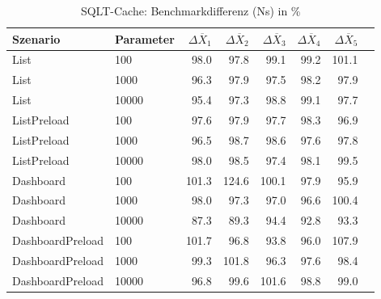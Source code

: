 
\begin{table}[ht]
\setlength{\extrarowheight}{-1pt}
\centering
\caption{SQLT-Cache: Benchmarkdifferenz (Ns) in \%}
\begin{tabular}{llrrrrrr}
\toprule
Szenario & Parameter & ${\Delta \overline{X}_1}$ & ${\Delta \overline{X}_2}$ & ${\Delta \overline{X}_3}$ & ${\Delta \overline{X}_4}$ & ${\Delta \overline{X}_5}$ \\
\midrule
	List & 100 &  98.0 & \cellcolor{green!11}  97.8 &  99.1 &  99.2 &  101.1 \\
	List & 1000 & \cellcolor{green!11}  96.3 & \cellcolor{green!11}  97.9 & \cellcolor{green!11}  97.5 &  98.2 & \cellcolor{green!11}  97.9 \\
	List & 10000 & \cellcolor{green!12}  95.4 & \cellcolor{green!11}  97.3 &  98.8 &  99.1 & \cellcolor{green!11}  97.7 \\
	ListPreload & 100 & \cellcolor{green!11}  97.6 & \cellcolor{green!11}  97.9 & \cellcolor{green!11}  97.7 &  98.3 & \cellcolor{green!11}  96.9 \\
	ListPreload & 1000 & \cellcolor{green!11}  96.5 &  98.7 &  98.6 & \cellcolor{green!11}  97.6 & \cellcolor{green!11}  97.8 \\
	ListPreload & 10000 & \cellcolor{green!11}  98.0 &  98.5 & \cellcolor{green!11}  97.4 &  98.1 &  99.5 \\
	Dashboard & 100 &  101.3 & \cellcolor{red!20}  124.6 &  100.1 & \cellcolor{green!11}  97.9 & \cellcolor{green!12}  95.9 \\
	Dashboard & 1000 &  98.0 & \cellcolor{green!11}  97.3 & \cellcolor{green!11}  97.0 & \cellcolor{green!11}  96.6 &  100.4 \\
	Dashboard & 10000 & \cellcolor{green!15}  87.3 & \cellcolor{green!14}  89.3 & \cellcolor{green!12}  94.4 & \cellcolor{green!13}  92.8 & \cellcolor{green!13}  93.3 \\
	DashboardPreload & 100 &  101.7 & \cellcolor{green!11}  96.8 & \cellcolor{green!12}  93.8 & \cellcolor{green!12}  96.0 & \cellcolor{red!13}  107.9 \\
	DashboardPreload & 1000 &  99.3 &  101.8 & \cellcolor{green!11}  96.3 & \cellcolor{green!11}  97.6 &  98.4 \\
	DashboardPreload & 10000 & \cellcolor{green!11}  96.8 &  99.6 &  101.6 &  98.8 &  99.0 \\
\bottomrule
\end{tabular}
\label{tab:benchmarkdifferenz_sqlt-cache_ns}
\end{table}
	